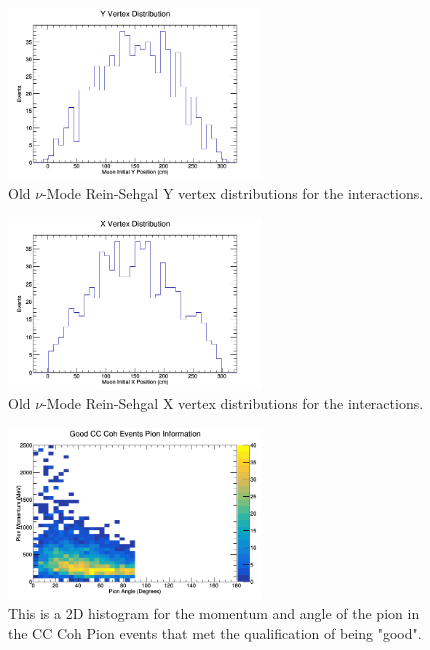 \documentclass[11pt]{article}
\begin{document}
\begin{figure}[H]
\centering
\includegraphics[width=0.6\textwidth]{OldNMReinSehgalImages/3-YVertexDistributionNMORS.png}
\caption{Old $\nu$-Mode Rein-Sehgal Y vertex distributions for the interactions.}
\end{figure}

\begin{figure}[H]
\centering
\includegraphics[width=0.6\textwidth]{OldNMReinSehgalImages/4-XVertexDistributionNMORS.png}
\caption{Old $\nu$-Mode Rein-Sehgal X vertex distributions for the interactions.}
\end{figure}

\begin{figure}[H]
\centering
\includegraphics[width=0.6\textwidth]{OldNMReinSehgalImages/5-GoodCCCohPionInfoNMORS.png}
\caption{This is a 2D histogram for the momentum and angle of the pion in the CC Coh Pion events that met the qualification of being "good".}
\end{figure}
\end{document}
